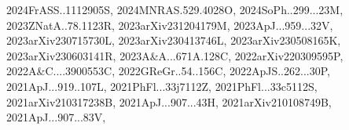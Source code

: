 \documentclass[12pt]{article}
\begin{document}
{2024FrASS..1112905S,%
2024MNRAS.529.4028O,%
2024SoPh..299...23M,%
2023ZNatA..78.1123R,%
2023arXiv231204179M,%
2023ApJ...959...32V,%
2023arXiv230715730L,%
2023arXiv230413746L,%
2023arXiv230508165K,%
2023arXiv230603141R,%
2023A&A...671A.128C,%
2022arXiv220309595P,%
2022A&C....3900553C,%
2022GReGr..54..156C,%
2022ApJS..262...30P,%
2021ApJ...919..107L,%
2021PhFl...33j7112Z,%
2021PhFl...33c5112S,%
2021arXiv210317238B,%
2021ApJ...907...43H,%
2021arXiv210108749B,%
2021ApJ...907...83V,%
}
\end{document}

